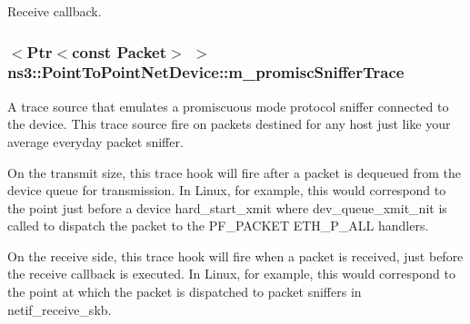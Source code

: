 Receive callback. 

\subsubsection[{\texorpdfstring{m\+\_\+promisc\+Sniffer\+Trace}{m_promiscSnifferTrace}}]{$<${\bf Ptr}$<$const {\bf Packet}$>$ $>$ ns3\+::\+Point\+To\+Point\+Net\+Device\+::m\+\_\+promisc\+Sniffer\+Trace\hspace{0.3cm}{\ttfamily [private]}}\hypertarget{classns3_1_1PointToPointNetDevice_ad1f77c2c8a3e70210dfd89f0d4b670de}{}\label{classns3_1_1PointToPointNetDevice_ad1f77c2c8a3e70210dfd89f0d4b670de}
A trace source that emulates a promiscuous mode protocol sniffer connected to the device. This trace source fire on packets destined for any host just like your average everyday packet sniffer.

On the transmit size, this trace hook will fire after a packet is dequeued from the device queue for transmission. In Linux, for example, this would correspond to the point just before a device {\ttfamily hard\+\_\+start\+\_\+xmit} where {\ttfamily dev\+\_\+queue\+\_\+xmit\+\_\+nit} is called to dispatch the packet to the P\+F\+\_\+\+P\+A\+C\+K\+ET E\+T\+H\+\_\+\+P\+\_\+\+A\+LL handlers.

On the receive side, this trace hook will fire when a packet is received, just before the receive callback is executed. In Linux, for example, this would correspond to the point at which the packet is dispatched to packet sniffers in {\ttfamily netif\+\_\+receive\+\_\+skb}. 
